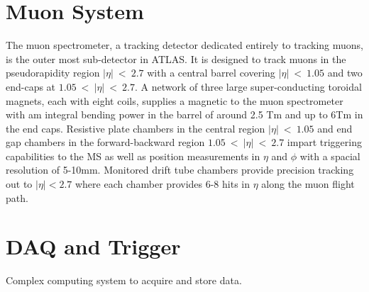 \section{Muon System}
The muon spectrometer, a tracking detector dedicated entirely to tracking muons, is the outer most sub-detector in ATLAS.  It is designed to track muons in the pseudorapidity region $|\eta|~<~2.7$ with a central barrel covering $|\eta|~<~1.05$ and two end-caps at $1.05~<~|\eta|~<~2.7$.  A network of three large super-conducting toroidal magnets, each with eight coils, supplies a magnetic to the muon spectrometer with am integral bending power in the barrel of around 2.5 Tm and up to 6Tm in the end caps.  Resistive plate chambers in the central region $|\eta|~<~1.05$ and end gap chambers in the forward-backward region $1.05~<~|\eta|~<~2.7$ impart triggering capabilities to the MS as well as position measurements in $\eta$ and $\phi$ with a spacial resolution of 5-10mm. Monitored drift tube chambers provide precision tracking out to $|\eta| < 2.7$ where each chamber provides 6-8 hits in $\eta$ along the muon flight path. 

\section{DAQ and Trigger}
Complex computing system to acquire and store data.

